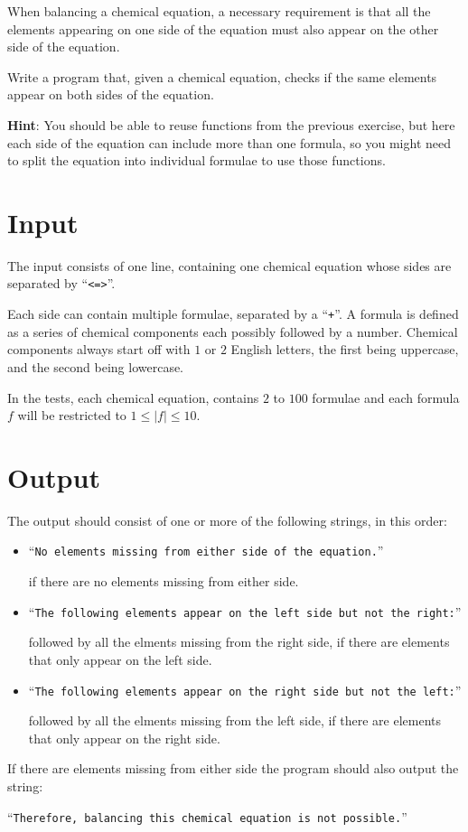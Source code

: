 
When balancing a chemical equation, a necessary requirement is that
all the elements appearing on one side of the equation
must also appear on the other side of the equation.

Write a program that, given a chemical equation,
checks if the same elements appear on both sides of the equation.

\textbf{Hint}: You should be able to reuse functions from the previous exercise,
but here each side of the equation can include more than one formula,
so you might need to split the equation into individual formulae to use those functions.


\section*{Input}

The input consists of one line,
containing one chemical equation whose sides are separated by ``\texttt{<=>}''.

Each side can contain multiple formulae, separated by a ``\texttt{+}''.
A formula is defined as a series of chemical components each possibly followed by a number.
Chemical components always start off with $1$ or $2$ English letters,
the first being uppercase, and the second being lowercase.

In the tests, each chemical equation, contains $2$ to $100$ formulae
and each formula $f$ will be restricted to $1 \le |f| \le 10$.


\section*{Output}

The output should consist of one or more of the following strings, in this order:
\begin{itemize}
    \item
    ``\texttt{No elements missing from either side of the equation.}''

    if there are no elements missing from either side.

    \item
    ``\texttt{The following elements appear on the left side but not the right:}''

    followed by all the elments missing from the right side,
    if there are elements that only appear on the left side.

    \item
    ``\texttt{The following elements appear on the right side but not the left:}''

    followed by all the elments missing from the left side,
    if there are elements that only appear on the right side.
\end{itemize}
If there are elements missing from either side
the program should also output the string:

``\texttt{Therefore, balancing this chemical equation is not possible.}''
